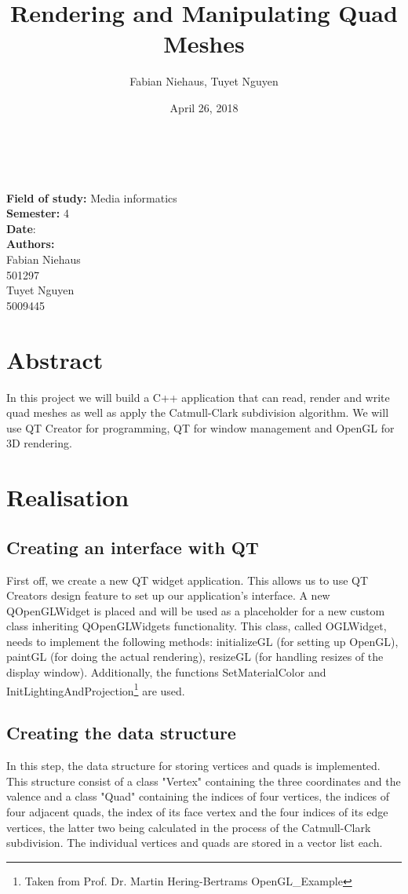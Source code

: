 \documentclass[12pt,a4paper]{scrartcl}
\title{Rendering and Manipulating Quad Meshes}
\author{Fabian Niehaus, Tuyet Nguyen}
\date{April 26, 2018}
\begin{document}
\begin{titlepage}
	\centering
	\ \\[2cm]
	{\huge\textbf{\@title}} 
	\\[3cm]
	\large
	\textbf{Field of study:} Media informatics \\
	\textbf{Semester:} 4
	\\[2cm]
	\textbf{Date}: \@date
	\\[2cm]
	\textbf {Authors:}
	\\Fabian Niehaus
	\\501297
	\\Tuyet Nguyen
	\\5009445
\end{titlepage}

\newpage
\setcounter{page}{0}
\tableofcontents

\newpage
\ofoot[]{\pagemark}
\normalsize

\section{Abstract}
In this project we will build a C++ application that can read, render and write quad meshes as well as apply the Catmull-Clark subdivision algorithm. We will use QT Creator for programming, QT for window management and OpenGL for 3D rendering.

\section{Realisation}

\subsection{Creating an interface with QT}
First off, we create a new QT widget application. This allows us to use QT Creators design feature to set up our application's interface. A new QOpenGLWidget is placed and will be used as a placeholder for a new custom class inheriting QOpenGLWidgets functionality. This class, called OGLWidget, needs to implement the following methods: initializeGL (for setting up OpenGL), paintGL (for doing the actual rendering), resizeGL (for handling resizes of the display window). Additionally, the functions SetMaterialColor and InitLightingAndProjection\footnote{Taken from Prof. Dr. Martin Hering-Bertrams OpenGL_Example} are used.

\subsection{Creating the data structure}
In this step, the data structure for storing vertices and quads is implemented. This structure consist of a class "Vertex" containing the three coordinates and the valence and a class "Quad" containing the indices of four vertices, the indices of four adjacent quads, the index of its face vertex and the four indices of its edge vertices, the latter two being calculated in the process of the Catmull-Clark subdivision. The individual vertices and quads are stored in a vector list each.
\end{document}
